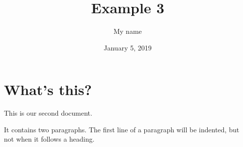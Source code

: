 \documentclass[a4paper,11pt]{article}
\begin{document}
\title{Example 3}
\author{My name}
\date{January 5, 2019}
\maketitle
\section{What's this?}
This   is   our second document.

It contains two paragraphs. The first line of a paragraph will be
indented, but not when it follows a heading.
\end{document}
